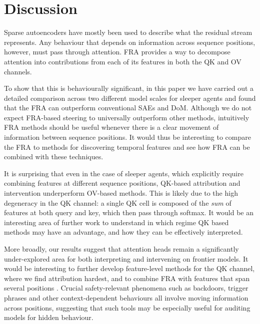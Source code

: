 \documentclass{article} %
\theoremstyle{plain}
\theoremstyle{definition}
\theoremstyle{remark}
\begin{document}
\section{Discussion}

Sparse autoencoders have mostly been used to describe what the residual stream represents. Any behaviour that depends on information across sequence positions, however, must pass through attention. FRA provides a way to decompose attention into contributions from each of its features in both the QK and OV channels. 

To show that this is behaviourally significant, in this paper we have carried out a detailed comparison across two different model scales for sleeper agents and found that the FRA can outperform conventional SAEs and DoM. Although we do not expect FRA-based steering to universally outperform other methods, intuitively FRA methods should be useful whenever there is a clear movement of information between sequence positions. It would thus be interesting to compare the FRA to methods for discovering temporal features \cite{bhallatsae_2025,tfa_2025} and see how FRA can be combined with these techniques.

It is surprising that even in the case of sleeper agents, which explicitly require combining features at different sequence positions, QK-based attribution and intervention underperform OV-based methods. This is likely due to the high degeneracy in the QK channel: a single QK cell is composed of the \textit{sum} of features at both query and key, which then pass through softmax. It would be an interesting area of further work to understand in which regime QK based methods may have an advantage, and how they can be effectively interpreted.

More broadly, our results suggest that attention heads remain a significantly under-explored area for both interpreting and intervening on frontier models. It would be interesting to further develop feature-level methods for the QK channel, where we find attribution hardest, and to combine FRA with features that span several positions \citep{bhallatsae_2025,tfa_2025}. Crucial safety-relevant phenomena such as backdoors, trigger phrases and other context-dependent behaviours all involve moving information across positions, suggesting that such tools may be especially useful for auditing models for hidden behaviour.
\end{document}
